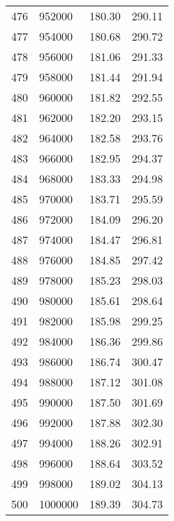 \documentclass{article}
\begin{document}
\begin{longtable}{@{}l l l l}
476 & 952000 & 180.30 & 290.11\\
477 & 954000 & 180.68 & 290.72\\
478 & 956000 & 181.06 & 291.33\\
479 & 958000 & 181.44 & 291.94\\
480 & 960000 & 181.82 & 292.55\\
481 & 962000 & 182.20 & 293.15\\
482 & 964000 & 182.58 & 293.76\\
483 & 966000 & 182.95 & 294.37\\
484 & 968000 & 183.33 & 294.98\\
485 & 970000 & 183.71 & 295.59\\
486 & 972000 & 184.09 & 296.20\\
487 & 974000 & 184.47 & 296.81\\
488 & 976000 & 184.85 & 297.42\\
489 & 978000 & 185.23 & 298.03\\
490 & 980000 & 185.61 & 298.64\\
491 & 982000 & 185.98 & 299.25\\
492 & 984000 & 186.36 & 299.86\\
493 & 986000 & 186.74 & 300.47\\
494 & 988000 & 187.12 & 301.08\\
495 & 990000 & 187.50 & 301.69\\
496 & 992000 & 187.88 & 302.30\\
497 & 994000 & 188.26 & 302.91\\
498 & 996000 & 188.64 & 303.52\\
499 & 998000 & 189.02 & 304.13\\
500 & 1000000 & 189.39 & 304.73\\
\end{longtable}
\end{document}

